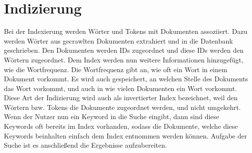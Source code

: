 \section{Indizierung}
Bei der Indexierung werden Wörter und Tokens mit Dokumenten assoziiert.
Dazu werden Wörter aus gecrawlten Dokumenten extrahiert und in die Datenbank geschrieben.
Den Dokumenten werden IDs zugeordnet und diese IDs werden den Wörtern zugeordnet.
Dem Index werden nun weitere Informationen hinzugefügt, wie die Wortfrequenz.
Die Wortfrequenz gibt an, wie oft ein Wort in einem Dokument vorkommt.
Es wird auch gespeichert, an welchen Stelle des Dokuments das Wort vorkommt, und auch in wie vielen Dokumenten ein Wort vorkommt.
Diese Art der Indizierung wird auch als invertierter Index bezeichnet, weil den Wörtern bzw.
Tokens die Dokumente zugeordnet werden, und nicht umgekehrt.
Wenn der Nutzer nun ein Keyword in die Suche eingibt, dann sind diese Keywords oft bereits im Index vorhanden, sodass die Dokumente, welche diese Keywords beinhalten einfach dem Index entnommen werden können.
Aufgabe der Suche ist es anschließend die Ergebnisse aufzubereiten.

